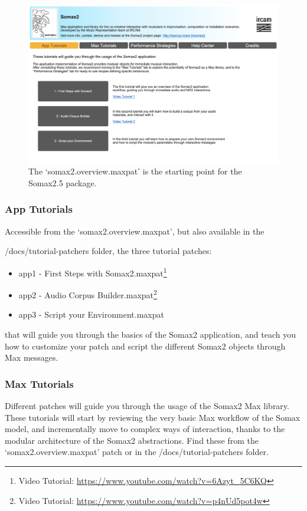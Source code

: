  \begin{figure}[h!]
    \centering        
 	\includegraphics[width=1\textwidth, keepaspectratio]{img/somax2_overview.png}
    \caption{The `somax2.overview.maxpat' is the starting point for the Somax2.5 package.}
    \label{fig:overview}
\end{figure}

\subsubsection{App Tutorials}

Accessible from the `somax2.overview.maxpat', but also available in the 

/docs/tutorial-patchers folder, the three tutorial patches:
\begin{itemize}
    \item app1 - First Steps with Somax2.maxpat\footnote{Video Tutorial: \url{https://www.youtube.com/watch?v=6Azyt_5C6KQ}}
    \item app2 - Audio Corpus Builder.maxpat\footnote{Video Tutorial: \url{https://www.youtube.com/watch?v=p4nUd5pot4w}}
    \item app3 - Script your Environment.maxpat
\end{itemize}

that will guide you through the basics of the Somax2 application, and teach you how to customize your patch and script the different Somax2 objects through Max messages.

\subsubsection{Max Tutorials}

Different patches will guide you through the usage of the Somax2 Max library. These tutorials will start by reviewing the very basic Max workflow of the Somax model, and incrementally move to complex ways of interaction, thanks to the modular architecture of the Somax2 abstractions. Find these from the `somax2.overview.maxpat' patch or in the /docs/tutorial-patchers folder.

